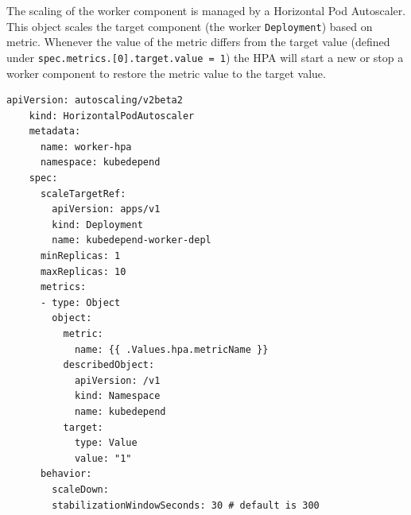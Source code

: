 The scaling of the worker component is managed by a Horizontal Pod Autoscaler. This object scales the target component (the worker \texttt{Deployment}) based on metric. Whenever the value of the metric differs from the target value (defined under \texttt{spec.metrics.[0].target.value = 1}) the HPA will start a new or stop a worker component to restore the metric value to the target value. 

\begin{minipage}{\linewidth}
	\begin{lstlisting}[caption={Worker \texttt{Horizontal Pod Autoscaler}}]
	apiVersion: autoscaling/v2beta2
	kind: HorizontalPodAutoscaler
	metadata:
	  name: worker-hpa
	  namespace: kubedepend
	spec:
	  scaleTargetRef:
	    apiVersion: apps/v1
	    kind: Deployment
	    name: kubedepend-worker-depl
	  minReplicas: 1
	  maxReplicas: 10
      metrics:
      - type: Object
	    object:
	      metric:
            name: {{ .Values.hpa.metricName }}
          describedObject:
            apiVersion: /v1
            kind: Namespace
            name: kubedepend
          target:
            type: Value
            value: "1"
      behavior:
        scaleDown:
        stabilizationWindowSeconds: 30 # default is 300
	\end{lstlisting}
\end{minipage}











